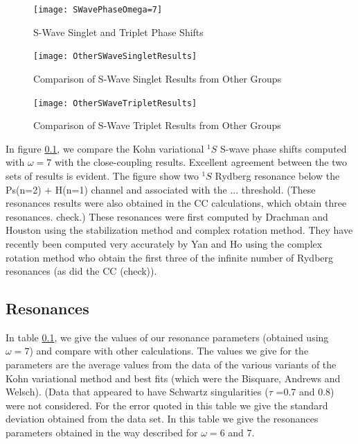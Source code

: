 \documentclass[preprint,showpacs,preprintnumbers,amsmath,amssymb]{revtex4}
\begin{document}
\begin{figure}
	\centering
	\texttt{[image: SWavePhaseOmega=7]}
	\caption{S-Wave Singlet and Triplet Phase Shifts}
	\label{fig:SWavePhaseOmega=7}
\end{figure}

\begin{figure}
	\centering
	\texttt{[image: OtherSWaveSingletResults]}
	\caption{Comparison of S-Wave Singlet Results from Other Groups}
	\label{fig:OtherSWaveSingletResults}
\end{figure}

\begin{figure}
	\centering
	\texttt{[image: OtherSWaveTripletResults]}
	\caption{Comparison of S-Wave Triplet Results from Other Groups}
	\label{fig:OtherSWaveTripletResults}
\end{figure}

In figure \ref{}, we compare the Kohn variational
$^1S$ S-wave phase shifts computed with $\omega = 7$
with the close-coupling results.
Excellent agreement between the
two sets of results is evident.
The figure show two $^1S$ Rydberg resonance below the
Ps(n=2) + H(n=1) channel
and associated
with the ... threshold.
(These resonances results were also obtained in the CC calculations,
which obtain three resonances. check.)
These resonances were first computed by
Drachman and Houston using the stabilization
method and complex rotation method.
They have recently been computed very accurately
by Yan and Ho
using the complex rotation method who
obtain the first three of the infinite
number of Rydberg resonances (as did the CC (check)).


\subsection{Resonances}

In table \ref{}, we give the values of our resonance
parameters (obtained using $\omega=7$) 
and compare with other calculations.
The values we give for the
parameters are the average values from
the data of the 
 various variants of the
Kohn variational method and  best fits (which were the
Bisquare, Andrews and Welsch).
(Data that appeared to have Schwartz singularities ($\tau$ =0.7 and 0.8)
were not considered.
For the error quoted in this table we give
the standard deviation obtained from the data set.
In this table we give the resonances parameters
obtained in the way described for $\omega=6$ and 7.
\end{document}
